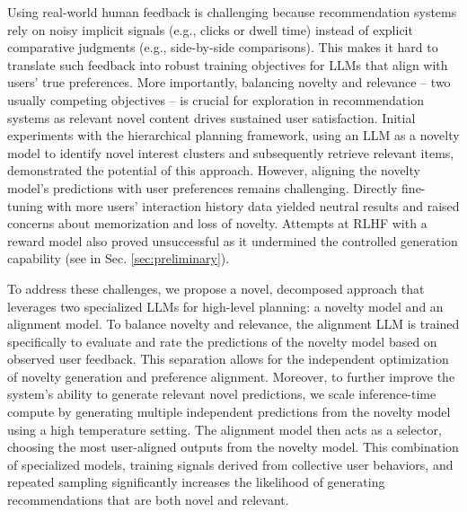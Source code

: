\documentclass[11pt]{article}
\newcommand{\jw}[1]{{\small\color{blue}{\bf JW: #1}}}
\newcommand{\yl}[1]{{\small\color{orange}{\bf YL: #1}}}
\begin{document}
Using real-world human feedback is challenging because recommendation systems rely on noisy implicit signals (e.g., clicks or dwell time) instead of explicit comparative judgments (e.g., side-by-side comparisons). This makes it hard to translate such feedback into robust training objectives for LLMs that align with users' true preferences.
More importantly, balancing novelty and relevance -- two usually competing objectives -- is crucial for exploration in recommendation systems as relevant novel content drives sustained user satisfaction. 
Initial experiments with the hierarchical planning \cite{wang2024llms} framework, using an LLM as a novelty 
model to identify novel interest clusters and subsequently retrieve relevant items, demonstrated the potential of this approach. However, aligning the novelty model's predictions with user preferences remains challenging.  Directly fine-tuning with more users' interaction history data yielded neutral results and raised concerns about memorization and loss of novelty. Attempts at RLHF \cite{ouyang2022training} with a reward model also proved unsuccessful as it undermined the controlled generation capability (see in Sec. \ref{sec:preliminary}). 


To address these challenges, we propose a novel, decomposed approach that leverages two specialized LLMs for high-level planning: a novelty model and an alignment model. 
To balance novelty and relevance, the alignment LLM is trained specifically to evaluate and rate the predictions of the novelty model based on observed user feedback. This separation allows for the independent optimization of novelty generation and preference alignment. Moreover, to further improve the system's ability to generate relevant novel predictions, we scale inference-time compute by generating multiple independent predictions from the novelty model using a high temperature setting. The alignment model then acts as a selector, choosing the most user-aligned outputs from the novelty model. This combination of specialized models, training signals derived from collective user behaviors, and repeated sampling significantly increases the likelihood of generating recommendations that are both novel and relevant.
\end{document}
